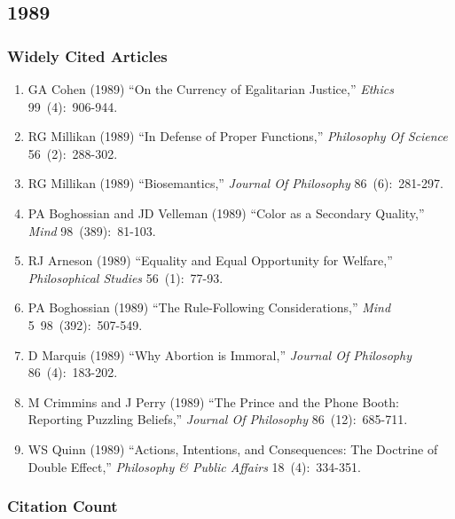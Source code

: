 \documentclass[
  10pt,
  letterpaper,
  DIV=11,
  numbers=noendperiod,
  twoside]{scrartcl}
\providecommand{\tightlist}{%
  \setlength{\itemsep}{0pt}\setlength{\parskip}{0pt}}\usepackage{longtable,booktabs,array}
\begin{document}
\newpage

\subsection{1989}\label{sec-s1989}

\subsubsection*{Widely Cited Articles}\label{widely-cited-articles-33}

\begin{enumerate}
\def\labelenumi{\arabic{enumi}.}
\tightlist
\item
  GA Cohen (1989) ``On the Currency of Egalitarian Justice,''
  \emph{Ethics} 99~(4):~906-944.
\item
  RG Millikan (1989) ``In Defense of Proper Functions,''
  \emph{Philosophy Of Science} 56~(2):~288-302.
\item
  RG Millikan (1989) ``Biosemantics,'' \emph{Journal Of Philosophy}
  86~(6):~281-297.
\item
  PA Boghossian and JD Velleman (1989) ``Color as a Secondary Quality,''
  \emph{Mind} 98~(389):~81-103.
\item
  RJ Arneson (1989) ``Equality and Equal Opportunity for Welfare,''
  \emph{Philosophical Studies} 56~(1):~77-93.
\item
  PA Boghossian (1989) ``The Rule-Following Considerations,''
  \emph{Mind} 5~98~(392):~507-549.
\item
  D Marquis (1989) ``Why Abortion is Immoral,'' \emph{Journal Of
  Philosophy} 86~(4):~183-202.
\item
  M Crimmins and J Perry (1989) ``The Prince and the Phone Booth:
  Reporting Puzzling Beliefs,'' \emph{Journal Of Philosophy}
  86~(12):~685-711.
\item
  WS Quinn (1989) ``Actions, Intentions, and Consequences: The Doctrine
  of Double Effect,'' \emph{Philosophy \& Public Affairs}
  18~(4):~334-351.
\end{enumerate}

\subsubsection*{Citation Count}\label{sec-count-1989}
\end{document}
